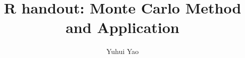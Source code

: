 \documentclass[12pt]{article}
\begin{document}
\thispagestyle{empty}
\vspace{-1in}
\title{R handout: Monte Carlo Method and Application}
\author{{Yuhui Yao}
}
\date{\vspace{-0.3in}}
\maketitle
\renewcommand\baselinestretch{1.33}

%


\normalsize

%
%
\end{document}
